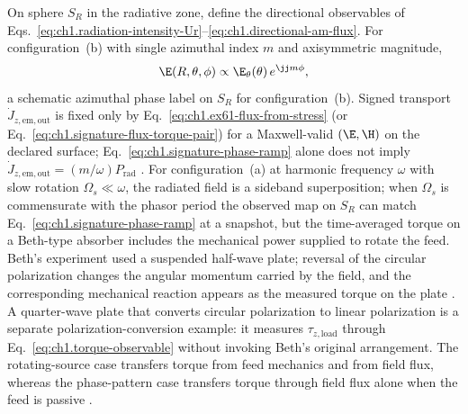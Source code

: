 On sphere \(S_R\) in the radiative zone, define the directional observables of
Eqs.~\eqref{eq:ch1.radiation-intensity-Ur}--\eqref{eq:ch1.directional-am-flux}.
For configuration~(b) with single azimuthal index \(m\) and axisymmetric magnitude,
\begin{equation}
\label{eq:ch1.signature-phase-ramp}
\E(R,\theta,\phi)\propto \E_\theta(\theta)\,e^{\jj m\phi},
\end{equation}
a schematic azimuthal phase label on $S_R$ for configuration~(b). Signed transport $\dot J_{z,\mathrm{em,out}}$ is fixed only by Eq.~\eqref{eq:ch1.ex61-flux-from-stress} (or Eq.~\eqref{eq:ch1.signature-flux-torque-pair}) for a Maxwell-valid $(\E,\H)$ on the declared surface; Eq.~\eqref{eq:ch1.signature-phase-ramp} alone does not imply $\dot J_{z,\mathrm{em,out}}=(m/\omega)P_{\mathrm{rad}}$ \cite{stratton1941,allen1992}. For configuration~(a) at harmonic frequency
\(\omega\) with slow rotation \(\Omega_s\ll\omega\), the radiated field is a
sideband superposition; when \(\Omega_s\) is commensurate with the phasor period the
observed map on \(S_R\) can match Eq.~\eqref{eq:ch1.signature-phase-ramp} at a
snapshot, but the time-averaged torque on a Beth-type absorber includes the
mechanical power supplied to rotate the feed. Beth's experiment used a suspended half-wave plate; reversal of the circular polarization changes the angular momentum carried by the field, and the corresponding mechanical reaction appears as the measured torque on the plate \cite{beth1936}. A quarter-wave plate that converts circular polarization to linear polarization is a separate polarization-conversion example: it measures \(\tau_{z,\mathrm{load}}\) through Eq.~\eqref{eq:ch1.torque-observable} without invoking Beth's original arrangement. The rotating-source case transfers torque from feed mechanics and from field flux, whereas the phase-pattern case transfers torque through field flux alone when the feed is passive \cite{stratton1941}.


